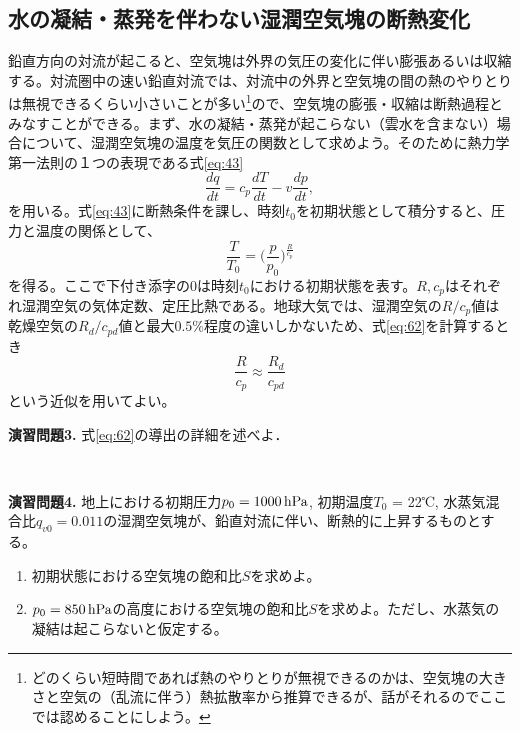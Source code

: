 \documentclass{ltjsarticle}
\begin{document}
\subsection{水の凝結・蒸発を伴わない湿潤空気塊の断熱変化}
鉛直方向の対流が起こると、空気塊は外界の気圧の変化に伴い膨張あるいは収縮する。対流圏中の速い鉛直対流では、対流中の外界と空気塊の間の熱のやりとりは無視できるくらい小さいことが多い\footnote{どのくらい短時間であれば熱のやりとりが無視できるのかは、空気塊の大きさと空気の（乱流に伴う）熱拡散率から推算できるが、話がそれるのでここでは認めることにしよう。}ので、空気塊の膨張・収縮は断熱過程とみなすことができる。まず、水の凝結・蒸発が起こらない（雲水を含まない）場合について、湿潤空気塊の温度を気圧の関数として求めよう。そのために熱力学第一法則の１つの表現である式\eqref{eq:43} 
\begin{displaymath}
 \frac{dq}{dt}=c_{p}\frac{dT}{dt}-v\frac{dp}{dt} ,
\end{displaymath}
を用いる。式\eqref{eq:43}に断熱条件を課し、時刻$t_{0}$を初期状態として積分すると、圧力と温度の関係として、
\begin{equation}\label{eq:62}
 \frac{T}{T_{0}}={\bigg (}\frac{p}{p_{0}}{\bigg )}^{\frac{R}{c_{p}}}
\end{equation}
を得る。ここで下付き添字の$0$は時刻$t_{0}$における初期状態を表す。$R, c_{p}$はそれぞれ湿潤空気の気体定数、定圧比熱である。地球大気では、湿潤空気の$R/c_{p}$値は乾燥空気の$R_{d}/c_{pd}$値と最大$0.5\%$程度の違いしかないため、式\eqref{eq:62}を計算するとき
\begin{equation}\label{eq:63}
 \frac{R}{c_{p}} \approx \frac{R_{d}}{c_{pd}}
\end{equation}
という近似を用いてよい。
\\

\begin{itembox}[l]{\bf{演習問題3.}}
式\eqref{eq:62}の導出の詳細を述べよ．
\end{itembox}
\\
\begin{itembox}[l]{\bf{演習問題4.}}
地上における初期圧力$p_{0}= 1000\,\rm{hPa}$, 初期温度$T_{0}$ = 22℃, 水蒸気混合比$q_{v0} = 0.011$の湿潤空気塊が、鉛直対流に伴い、断熱的に上昇するものとする。
\begin{enumerate}
\item 初期状態における空気塊の飽和比$S$を求めよ。
\item $p_{0}= 850\,\rm{hPa}$の高度における空気塊の飽和比$S$を求めよ。ただし、水蒸気の凝結は起こらないと仮定する。
\end{enumerate}
\end{itembox}
\end{document}
